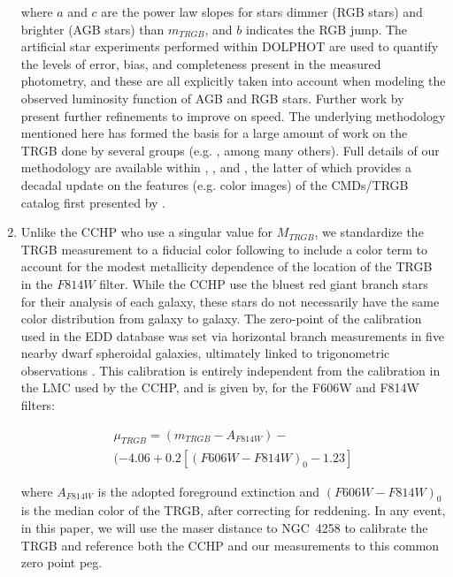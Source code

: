 \documentclass[twocolumn]{aastex62}
\begin{document}
\begin{enumerate}
    where $a$ and $c$ are the power law slopes for stars dimmer (RGB stars) and brighter (AGB stars) than $m_{TRGB}$, and $b$ indicates the RGB jump. The artificial star experiments performed within DOLPHOT are used to quantify the levels of error, bias, and completeness present in the measured photometry, and these are all explicitly taken into account when modeling the observed luminosity function of AGB and RGB stars. Further work by \cite{2014AJ....148....7W} present further refinements to improve on speed. The underlying methodology mentioned here has formed the basis for a large amount of work on the TRGB done by several groups (e.g. \citealt{2011AJ....141..106J,2014MNRAS.443.1281K, 2017AJ....154...51M, 2018MNRAS.474.3221M, 2019ApJ...872...80C}, among many others). Full details of our methodology are available within \cite{2006AJ....132.2729M}, \cite{2014AJ....148....7W}, and \cite{2021arXiv210402649A}, the latter of which provides a decadal update on the features (e.g. color images) of the CMDs/TRGB catalog first presented by \cite{2009AJ....138..332J}.
    
    \item Unlike the CCHP who use a singular value for $M_{TRGB}$, we standardize the TRGB measurement to a fiducial color following \cite{2007ApJ...661..815R} to include a color term to account for the modest metallicity dependence of the location of the TRGB in the $F814W$ filter. While the CCHP use the bluest red giant branch stars for their analysis of each galaxy, these stars do not necessarily have the same color distribution from galaxy to galaxy. The zero-point of the \cite{2007ApJ...661..815R} calibration used in the EDD database was set via horizontal branch measurements in five nearby dwarf spheroidal galaxies, ultimately linked to trigonometric observations \citep{2000ApJ...533..215C}. This calibration is entirely independent from the calibration in the LMC used by the CCHP, and is given by, for the F606W and F814W filters:
    
    \begin{multline}
        \mu_{TRGB} = (m_{TRGB}-A_{F814W}) - \\ (-4.06 + 0.2[(F606W-F814W)_{0} - 1.23]
    \end{multline}
    
    where $A_{F814W}$ is the adopted foreground extinction and $(F606W-F814W)_{0}$ is the median color of the TRGB, after correcting for reddening. In any event, in this paper, we will use the maser distance to NGC~4258 to calibrate the TRGB and reference both the CCHP and our measurements to this common zero point peg.

    
\end{enumerate}
\end{document}
